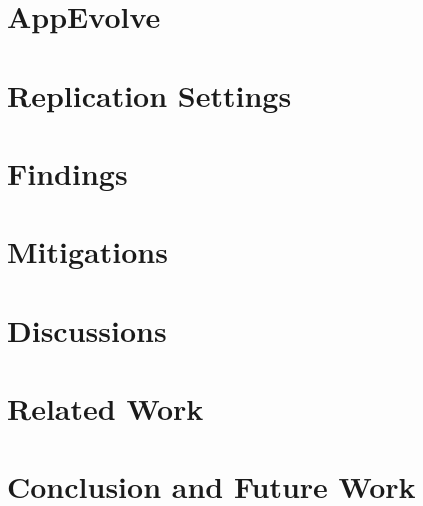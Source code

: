 \documentclass[conference]{IEEEtran}
\begin{document}
\section{AppEvolve}\label{sec:approach}


\section{Replication Settings}\label{sec:replication}


\section{Findings}\label{sec:findings}


\section{Mitigations}\label{sec:mitigations}


\section{Discussions}\label{sec:discuss}


\section{Related Work}\label{sec:related}


\section{Conclusion and Future Work}\label{sec:conclusion}



{}

\end{document}
